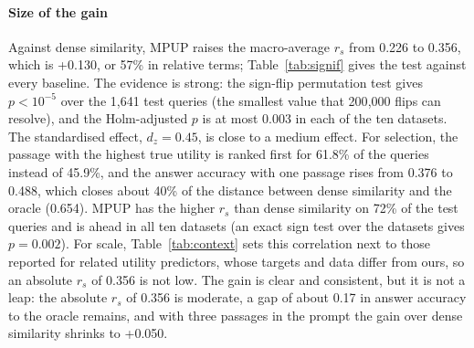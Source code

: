 \documentclass[conference]{IEEEtran}
\begin{document}
\paragraph{Size of the gain} Against dense similarity, MPUP raises the macro-average $r_s$ from 0.226 to 0.356, which is +0.130, or 57\% in relative terms; Table~\ref{tab:signif} gives the test against every baseline. The evidence is strong: the sign-flip permutation test gives $p < 10^{-5}$ over the 1,641 test queries (the smallest value that 200{,}000 flips can resolve), and the Holm-adjusted $p$ is at most 0.003 in each of the ten datasets. The standardised effect, $d_z = 0.45$, is close to a medium effect. For selection, the passage with the highest true utility is ranked first for 61.8\% of the queries instead of 45.9\%, and the answer accuracy with one passage rises from 0.376 to 0.488, which closes about 40\% of the distance between dense similarity and the oracle (0.654). MPUP has the higher $r_s$ than dense similarity on 72\% of the test queries and is ahead in all ten datasets (an exact sign test over the datasets gives $p = 0.002$). For scale, Table~\ref{tab:context} sets this correlation next to those reported for related utility predictors, whose targets and data differ from ours, so an absolute $r_s$ of 0.356 is not low. The gain is clear and consistent, but it is not a leap: the absolute $r_s$ of 0.356 is moderate, a gap of about 0.17 in answer accuracy to the oracle remains, and with three passages in the prompt the gain over dense similarity shrinks to +0.050.
\end{document}
